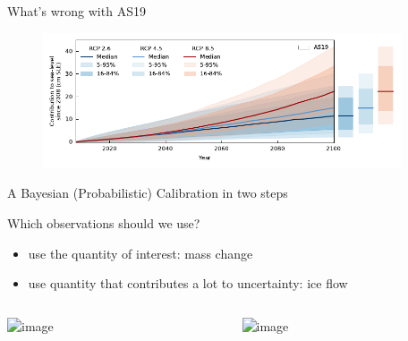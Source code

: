 \documentclass[hide notes,intlimits]{beamer}
\begin{document}
\begin{frame}{What's wrong with AS19}
  \begin{minipage}[t][4cm][t]{\textwidth}
    \begin{figure}
      \includegraphics[height=4cm]{projection_as19_bars}
    \end{figure}
  \end{minipage}
  \begin{minipage}[t][3cm][t]{\textwidth}
  \end{minipage}
\end{frame}

\begin{frame}{A Bayesian (Probabilistic) Calibration in two steps}
    \begin{minipage}[t][2cm][t]{\textwidth}
      \begin{block}{Which observations should we use?}
        \begin{itemize}
        \item<1-> use the quantity of interest: mass change
        \item<2> use quantity that contributes a lot to uncertainty: ice flow
        \end{itemize}
        \note[item]{}
      \end{block}
  \end{minipage}
    \begin{minipage}[t][6cm][t]{\textwidth}
        \begin{columns}[c]
    \begin{column}{.3\textwidth}
    \includegraphics<1->[height=5.5cm]{greenland-obs-rignot}
    \end{column}
    \begin{column}{.65\textwidth}
    \includegraphics<2>[height=3cm]{GIS_hist_only_obs}
    \end{column}
  \end{columns}

    \end{minipage}

\end{frame}
\end{document}
